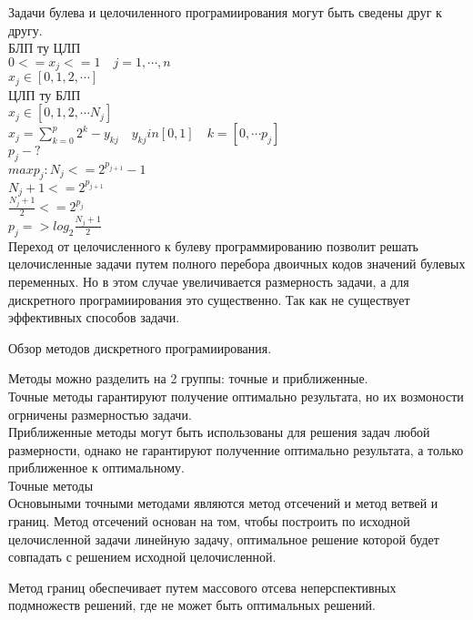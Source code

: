 Задачи булева и целочиленного програмиирования могут быть сведены друг к другу.\\
БЛП ту ЦЛП\\
$0 <=x_j <= 1 \quad j = 1, \cdots , n$\\
$x_j  \in [0,1,2, \cdots]$\\

ЦЛП ту БЛП\\
$x_j  \in [0,1,2, \cdots N_j]$\\
$x_j  =  \sum \limits_{k=0}^p  2^k - y_{kj} \quad y_{kj} in [0,1] \quad k = [0, \cdots p_j]$\\
$p_j - ? $\\
$ max p_j : N_j <= 2^{p_{j+1}} - 1$\\
$N_j + 1 <= 2^{p_{j+1}} $\\
$\frac{N_j + 1}{2} <= 2^{p_{j}} $\\
$p_j => log_2 \frac{N_j + 1}{2}$\\

Переход от целочисленного к булеву программированию позволит решать целочисленные задачи путем полного перебора
двоичных кодов значений булевых переменных.
Но в этом случае увеличивается размерность задачи, а для дискретного програмиирования это существенно.
Так как не существует эффективных способов задачи.

Обзор методов дискретного програмиирования.

Методы можно разделить на 2 группы: точные и приближенные.\\
Точные методы гарантируют получение оптимально результата, но их возмоности огрничены размерностью задачи.\\
Приближенные методы могут быть использованы для решения задач любой размерности,
однако не гарантируют полученние оптимально результата, а только приближенное к оптимальному.\\

Точные методы\\
Основыными точными методами являются метод отсечений и метод ветвей и границ.
Метод отсечений основан на том, чтобы построить по исходной целочисленной задачи линейную задачу,
оптимальное решение которой будет совпадать с решением исходной целочисленной.

Метод границ обеспечивает     путем массового отсева неперспективных подмножеств решений, где не может быть оптимальных решений.
 

